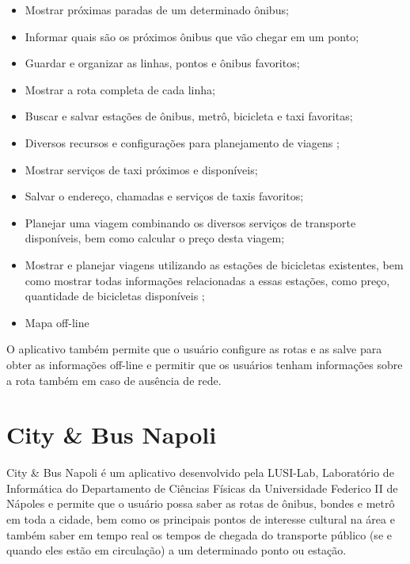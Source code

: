 \begin{itemize}
\item Mostrar próximas paradas de um determinado ônibus;
\item Informar quais são os próximos ônibus que vão chegar em um ponto;
\item Guardar e organizar as linhas, pontos e ônibus favoritos;
\item Mostrar a rota completa de cada linha;
\item Buscar e salvar estações de ônibus, metrô, bicicleta e taxi favoritas;
\item Diversos recursos e configurações para planejamento de viagens ;
\item Mostrar serviços de taxi próximos e disponíveis;
\item Salvar o endereço, chamadas e serviços de taxis favoritos;
\item Planejar uma viagem combinando os diversos serviços de transporte disponíveis, bem como calcular o preço desta viagem;
\item Mostrar e planejar viagens utilizando as estações de bicicletas existentes, bem como mostrar todas informações relacionadas a essas estações, como preço, quantidade de bicicletas disponíveis ;
\item Mapa off-line 
\end{itemize}

O aplicativo também permite que o usuário configure as rotas e as salve para obter as informações off-line e permitir que os usuários tenham informações sobre a rota também em caso de ausência de rede.

\section{City \& Bus Napoli}

City \& Bus Napoli é um aplicativo desenvolvido pela LUSI-Lab, Laboratório de Informática do Departamento de Ciências Físicas da Universidade Federico II de Nápoles e permite que o usuário possa saber as rotas de ônibus, bondes e metrô em toda a cidade, bem como os principais pontos de interesse cultural na área e também saber em tempo real os tempos de chegada do transporte público (se e quando eles estão em circulação) a um determinado ponto ou estação. 

